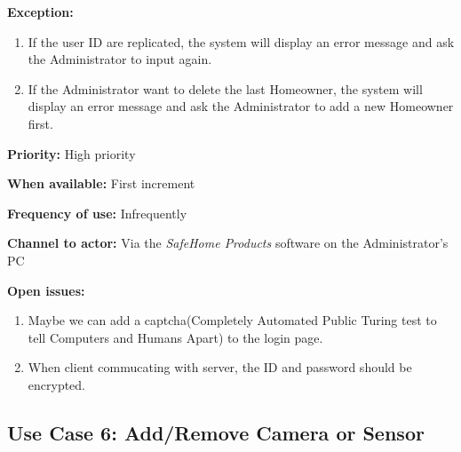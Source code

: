 \documentclass[twoside,11pt]{article}
\begin{document}
\begin{center}
{{\begin{multicols}{2}
                \textbf{Exception:}

                \begin{enumerate}
                    \item If the user ID are replicated, the system will display an error message and ask the Administrator to input again.
                    \item If the Administrator want to delete the last Homeowner, the system will display an error message and ask the Administrator to add a new Homeowner first.
                \end{enumerate}

                \textbf{Priority:} High priority

                \textbf{When available:} First increment

                \textbf{Frequency of use:} Infrequently

                \textbf{Channel to actor:} Via the \emph{SafeHome Products} software on the Administrator's PC

                \textbf{Open issues:}

                \begin{enumerate}
                    \item Maybe we can add a captcha(Completely Automated Public Turing test to tell Computers and Humans Apart) to the login page.
                    \item When client commucating with server, the ID and password should be encrypted.
                \end{enumerate}

            \end{multicols}}}
\end{center}
\newpage

\subsection{Use Case 6: Add/Remove Camera or Sensor}
\end{document}
